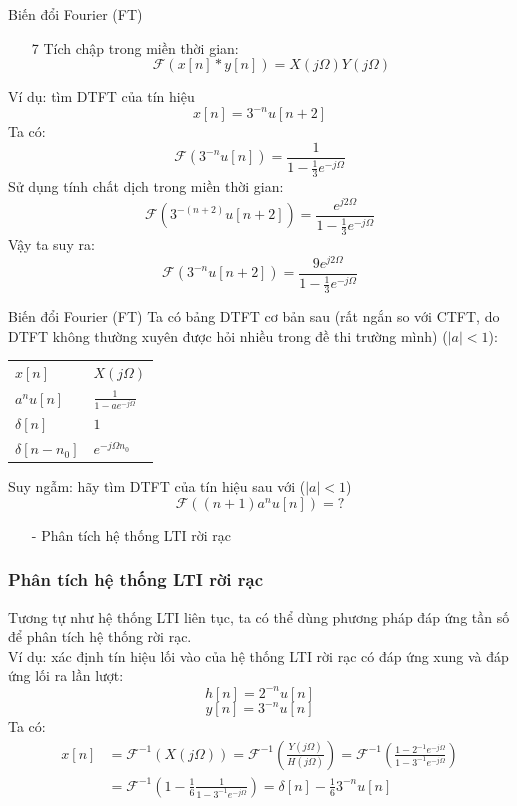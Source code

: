 \documentclass[8pt]{beamer}
\begin{document}
\begin{frame}{Biến đổi Fourier (FT)}
\begin{enumerate}
	\item[7] \alert{Tích chập trong miền thời gian:}
		\alert{$$\mathscr{F}(x[n]*y[n])=X(j\Omega)Y(j\Omega)$$}
\end{enumerate}
Ví dụ: tìm DTFT của tín hiệu
$$x[n]=3^{-n}u[n+2]$$
Ta có: 
$$\mathscr{F}(3^{-n}u[n])=\frac{1}{1-\frac{1}{3}e^{-j\Omega }}$$
Sử dụng tính chất dịch trong miền thời gian:
$$\mathscr{F}(3^{-(n+2)}u[n+2])=\frac{e^{j2\Omega}}{1-\frac{1}{3}e^{-j\Omega }}$$
Vậy ta suy ra:
$$\mathscr{F}(3^{-n}u[n+2])=\frac{9e^{j2\Omega}}{1-\frac{1}{3}e^{-j\Omega }}$$
\end{frame}
\begin{frame}{Biến đổi Fourier (FT)}
Ta có bảng DTFT cơ bản sau (rất ngắn so với CTFT, do DTFT không thường xuyên được hỏi nhiều trong đề thi trường mình) ($|a|<1$):
\begin{center}
\begin{tabular}{ |l|l| } 
 \hline
 $x[n]$ & $X(j\Omega)$\\ 
 $a^{n}u[n]$ & $\frac{1}{1-ae^{-j\Omega }}$ \\ 
 $\delta[n]$ & $1$ \\ 
 $\delta[n-n_{0}]$ & $e^{-j\Omega n_{0}}$\\
 \hline
\end{tabular}
\end{center}
Suy ngẫm: hãy tìm DTFT của tín hiệu sau với ($|a|<1$)
$$\mathscr{F}((n+1)a^n u[n])=?$$
\begin{itemize}
	\item[-] Phân tích hệ thống LTI rời rạc
\end{itemize}
\subsubsection{Phân tích hệ thống LTI rời rạc}
Tương tự như hệ thống LTI liên tục, ta có thể dùng phương pháp đáp ứng tần số để phân tích hệ thống rời rạc.
\\ Ví dụ: xác định tín hiệu lối vào của hệ thống LTI rời rạc có đáp ứng xung và đáp ứng lối ra lần lượt: $$h[n]=2^{-n}u[n]$$ $$y[n]=3^{-n}u[n]$$
Ta có: 
\begin{equation*}
\begin{split}
	x[n]&=\mathscr{F}^{-1}(X(j\Omega))=\mathscr{F}^{-1}\left(\frac{Y(j\Omega)}{H(j\Omega)}\right)=\mathscr{F}^{-1}\left(\frac{1-2^{-1}e^{-j\Omega}}{1-3^{-1}e^{-j\Omega}}\right)\\
	    &=\mathscr{F}^{-1}\left(1-\frac{1}{6}\frac{1}{1-3^{-1}e^{-j\Omega}}\right)=\delta[n]-\frac{1}{6}3^{-n}u[n]
\end{split}
\end{equation*}
\end{frame}
\end{document}
